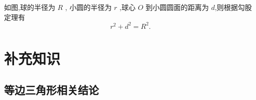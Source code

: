\documentclass{ctexart}
\begin{document}
如图,球的半径为 $R$ , 小圆的半径为 $r$ ,球心 $O$ 到小圆圆面的距离为 $d$,则根据勾股定理有
$$
r^2 + d^2 =R^2.
$$
\clearpage


\section{补充知识}
\subsection{等边三角形相关结论}

\end{document}
